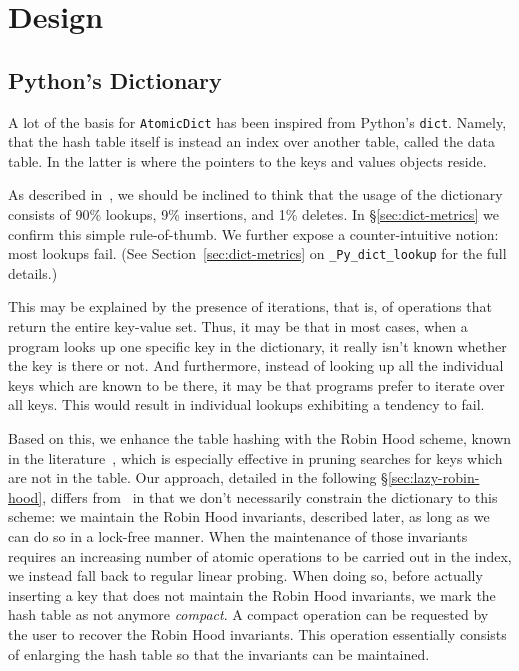 \chapter{Design}\label{ch:design}


\section{Python's Dictionary}\label{sec:python-dict}

A lot of the basis for \texttt{AtomicDict} has been inspired from Python's \texttt{dict}.
Namely, that the hash table itself is instead an index over another table, called the data table.
In the latter is where the pointers to the keys and values objects reside.

As described in~\cite[\S13.1]{art-mp}, we should be inclined to think that the usage of the dictionary consists of 90\% lookups, 9\% insertions, and 1\% deletes.
In \S\ref{sec:dict-metrics} we confirm this simple rule-of-thumb.
We further expose a counter-intuitive notion: most lookups fail.
(See Section~\ref{sec:dict-metrics} on \texttt{\_Py\_dict\_lookup} for the full details.)

This may be explained by the presence of iterations, that is, of operations that return the entire key-value set.
Thus, it may be that in most cases, when a program looks up one specific key in the dictionary, it really isn't known whether the key is there or not.
And furthermore, instead of looking up all the individual keys which are known to be there, it may be that programs prefer to iterate over all keys.
This would result in individual lookups exhibiting a tendency to fail.

Based on this, we enhance the table hashing with the Robin Hood scheme, known in the literature~\cite{robin-hood,bolt}, which is especially effective in pruning searches for keys which are not in the table.
Our approach, detailed in the following \S\ref{sec:lazy-robin-hood}, differs from~\cite{bolt} in that we don't necessarily constrain the dictionary to this scheme: we maintain the Robin Hood invariants, described later, as long as we can do so in a lock-free manner.
When the maintenance of those invariants requires an increasing number of atomic operations to be carried out in the index, we instead fall back to regular linear probing.
When doing so, before actually inserting a key that does not maintain the Robin Hood invariants, we mark the hash table as not anymore \emph{compact}.
A compact operation can be requested by the user to recover the Robin Hood invariants.
This operation essentially consists of enlarging the hash table so that the invariants can be maintained.

